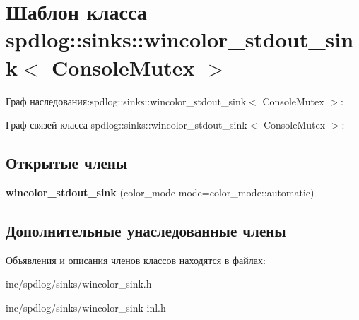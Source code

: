 \hypertarget{classspdlog_1_1sinks_1_1wincolor__stdout__sink}{}\section{Шаблон класса spdlog\+:\+:sinks\+:\+:wincolor\+\_\+stdout\+\_\+sink$<$ Console\+Mutex $>$}
\label{classspdlog_1_1sinks_1_1wincolor__stdout__sink}


Граф наследования\+:spdlog\+:\+:sinks\+:\+:wincolor\+\_\+stdout\+\_\+sink$<$ Console\+Mutex $>$\+:


Граф связей класса spdlog\+:\+:sinks\+:\+:wincolor\+\_\+stdout\+\_\+sink$<$ Console\+Mutex $>$\+:
\subsection*{Открытые члены}
\begin{DoxyCompactItemize}
\item 
\mbox{\label{classspdlog_1_1sinks_1_1wincolor__stdout__sink_a76ef0089437f3073f37ce95e3c9ff044}} 
{\bfseries wincolor\+\_\+stdout\+\_\+sink} (color\+\_\+mode mode=color\+\_\+mode\+::automatic)
\end{DoxyCompactItemize}
\subsection*{Дополнительные унаследованные члены}


Объявления и описания членов классов находятся в файлах\+:\begin{DoxyCompactItemize}
\item 
inc/spdlog/sinks/wincolor\+\_\+sink.\+h\item 
inc/spdlog/sinks/wincolor\+\_\+sink-\/inl.\+h\end{DoxyCompactItemize}
